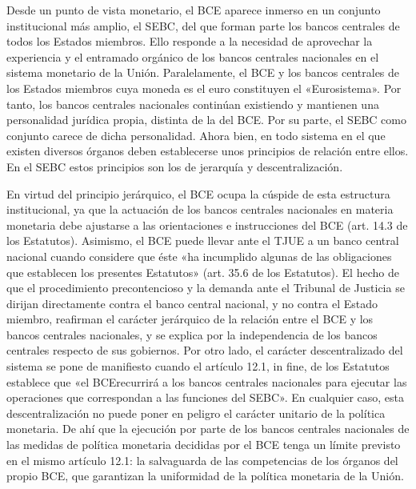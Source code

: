 \documentclass[10pt,a4paper]{article}
\begin{document}
Desde un punto de vista monetario, el BCE aparece inmerso en un conjunto institucional más amplio, el SEBC, del que forman parte los bancos centrales de todos los Estados miembros. Ello responde a la necesidad de aprovechar la experiencia y el entramado orgánico de los bancos centrales nacionales en el sistema monetario de la Unión. Paralelamente, el BCE y los bancos centrales de los Estados miembros cuya moneda es el euro constituyen el «Eurosistema». Por tanto, los bancos centrales nacionales continúan existiendo y mantienen una personalidad jurídica propia, distinta de la del BCE. Por su parte, el SEBC como  conjunto carece de dicha personalidad. Ahora bien, en todo sistema en el que existen diversos órganos deben establecerse unos principios de relación entre ellos. En el SEBC estos principios son los de jerarquía y descentralización.

En virtud del principio jerárquico, el BCE ocupa la cúspide de esta estructura institucional, ya que la actuación de los bancos centrales nacionales en materia monetaria debe ajustarse a las orientaciones e instrucciones del BCE (art. 14.3 de los Estatutos). Asimismo, el BCE puede llevar ante el TJUE a un banco central nacional cuando considere que éste «ha incumplido algunas de las obligaciones que establecen los presentes Estatutos» (art. 35.6 de los Estatutos). El hecho de que el procedimiento precontencioso y la demanda ante el Tribunal de Justicia se dirijan directamente contra el banco central nacional, y no contra el Estado miembro, reafirman el carácter jerárquico de la relación entre el BCE y los bancos centrales nacionales, y se explica por la independencia de los bancos centrales respecto de sus gobiernos. Por otro lado, el carácter descentralizado del sistema se pone de manifiesto cuando el artículo 12.1, in fine, de los Estatutos establece que «el BCErecurrirá a los bancos centrales nacionales para ejecutar las operaciones que correspondan a las funciones del SEBC». En cualquier caso, esta descentralización no puede poner en peligro el carácter unitario de la política monetaria. De ahí que la ejecución por parte de los bancos centrales nacionales de las medidas de política monetaria decididas por el BCE tenga un límite previsto en el mismo artículo 12.1: la salvaguarda de las competencias de los órganos del propio BCE, que garantizan la uniformidad de la política monetaria de la Unión.
\end{document}
